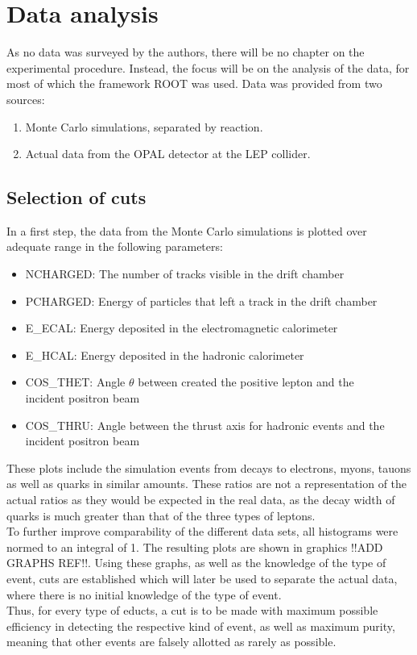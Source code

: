\section{Data analysis}
As no data was surveyed by the authors, there will be no chapter on the experimental procedure. Instead, the focus will be on the analysis of the data, for most of which the framework ROOT was used. Data was provided from two sources:
\begin{enumerate}
	\item Monte Carlo simulations, separated by reaction.
	\item Actual data from the OPAL detector at the LEP collider.
\end{enumerate}


\subsection{Selection of cuts}
In a first step, the data from the Monte Carlo simulations is plotted over adequate range in the following parameters:
\begin{itemize}
	\item NCHARGED: The number of tracks visible in the drift chamber
	\item PCHARGED: Energy of particles that left a track in the drift chamber
	\item E\_ECAL: Energy deposited in the electromagnetic calorimeter
	\item E\_HCAL: Energy deposited in the hadronic calorimeter
	\item COS\_THET: Angle $\theta$ between created the positive lepton and the \\incident positron beam
	\item COS\_THRU: Angle between the thrust axis for hadronic events and the \\incident positron beam
\end{itemize}
These plots include the simulation events from decays to electrons, myons, tauons as well as quarks in similar amounts. These ratios are not a representation of the actual ratios as they would be expected in the real data, as the decay width of quarks is much greater than that of the three types of leptons. \\
To further improve comparability of the different data sets, all histograms were normed to an integral of 1. The resulting plots are shown in graphics !!ADD GRAPHS REF!!. Using these graphs, as well as the knowledge of the type of event, cuts are established which will later be used to separate the actual data, where there is no initial knowledge of the type of event.\\
Thus, for every type of educts, a cut is to be made with maximum possible efficiency in detecting the respective kind of event, as well as maximum purity, meaning that other events are falsely allotted as rarely as possible.
